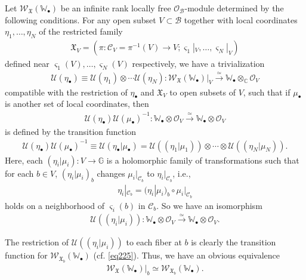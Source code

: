 \documentclass[11pt,b5paper,notitlepage]{article}
\theoremstyle{definition}
\theoremstyle{plain}
\newcommand{\fk}{\mathfrak}
\newcommand{\mc}{\mathcal}
\newcommand{\scr}{\mathscr}
\newcommand{\sgm}{\varsigma}
\newcommand{\blt}{\bullet}
\newcommand{\Wbb}{\mathbb W}
\newcommand{\Gbb}{\mathbb G}
\newcommand{\Cbb}{\mathbb C}
\numberwithin{equation}{section}
\begin{document}
Let $\scr W_{\fk X}(\Wbb_\blt)$ be an infinite rank locally free $\scr O_{\mc B}$-module \index{W@$\scr W(\Wbb_i)$, $\scr W_{\fk X}(\Wbb_\blt)$} determined by the following conditions. For any open subset $V\subset\mc B$ together with local coordinates $\eta_1,\dots,\eta_N$ of the restricted family \index{XV@$\fk X_V$}
\begin{align}
\fk X_V=(\pi:\mc C_V=\pi^{-1}(V)\rightarrow V;\sgm_1|_V,\dots,\sgm_N|_V)
\end{align}
defined near $\sgm_1(V),\dots,\sgm_N(V)$ respectively, we have a trivialization
\begin{align}
\mc U(\eta_\blt)\equiv \mc U(\eta_1)\otimes\cdots\mc U(\eta_N):\scr W_{\fk X}(\Wbb_\blt)|_V\xrightarrow{\simeq}\Wbb_\blt\otimes_\Cbb\scr O_V
\end{align}
compatible with the restriction of $\eta_\blt$ and $\fk X_V$ to open subsets of $V$, such that if $\mu_\blt$ is another set of local coordinates, then \index{U@$\mc U(\alpha),\mc U(\eta),\mc U(\eta_\blt)$}
\begin{align*}
\mc U(\eta_\blt)\mc U(\mu_\blt)^{-1}:\Wbb_\blt\otimes\scr O_V\xrightarrow{\simeq}\Wbb_\blt\otimes\scr O_V
\end{align*}
is defined by the transition function
\begin{align}
\mc U(\eta_\blt)\mc U(\mu_\blt)^{-1}\equiv \mc U(\eta_\blt|\mu_\blt)=\mc U((\eta_1|\mu_1))\otimes\cdots\otimes\mc U((\eta_N|\mu_N)).
\end{align}
Here, each $(\eta_i|\mu_i):V\rightarrow\Gbb$ is a holomorphic family of transformations such that for each $b\in V$, $(\eta_i|\mu_i)_b$ changes $\mu_i|_{\mc C_b}$ to $\eta_i|_{\mc C_b}$, i.e., 
\begin{align*}
\eta_i|_{\mc C_b}=(\eta_i|\mu_i)_b\circ \mu_i|_{\mc C_b}
\end{align*}
holds on a neighborhood of $\sgm_i(b)$ in $\mc C_b$. So we have an isomorphism
\begin{align*}
\mc U((\eta_i|\mu_i)):\Wbb_\blt\otimes\scr O_V\xrightarrow{\simeq}\Wbb_\blt\otimes\scr O_V.
\end{align*}


The restriction of $\mc U((\eta_i|\mu_i))$ to each fiber at $b$ is clearly the transition function for $\scr W_{\fk X_b}(\Wbb_\blt)$ (cf. \eqref{eq225}). Thus, we have an obvious equivalence
\begin{align}
\scr W_{\fk X}(\Wbb_\blt)\big|_b\simeq \scr W_{\fk X_b}(\Wbb_\blt).
\end{align}
\end{document}
